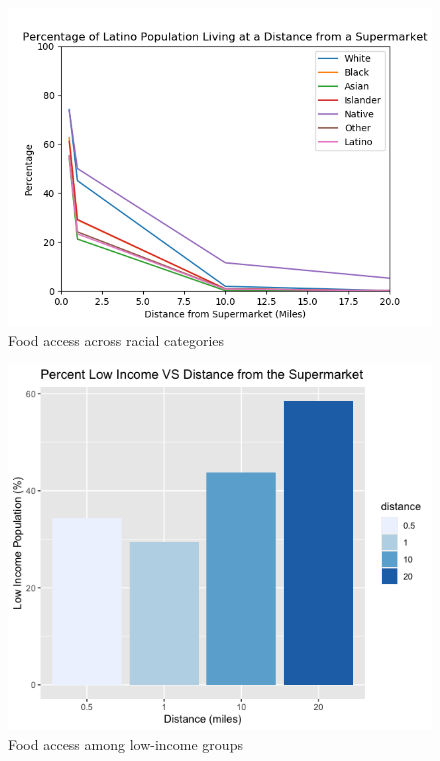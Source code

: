 \documentclass[letterpaper]{article} %
\begin{document}
\begin{figure}[ht!] 
	\caption{Food access across racial categories \label{fig:race}}
	\centering
	\includegraphics[width=.6\paperwidth]{Figure_1.png}
\end{figure}

\begin{figure}[ht!] 
	\caption{Food access among low-income groups \label{fig:low income}}
	\centering
	\includegraphics[width=.6\paperwidth]{Figure_2.png}
\end{figure}
\end{document}
